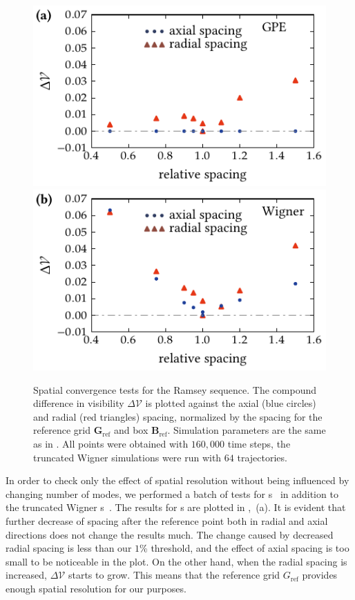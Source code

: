 \begin{figure}
    \centerline{%
    \includegraphics{figures_generated/test/grid_check_gpe.pdf}%
    \includegraphics{figures_generated/test/grid_check_wigner.pdf}}

    \caption[Spatial convergence tests]{
    Spatial convergence tests for the Ramsey sequence.
    The compound difference in visibility $\Delta \mathcal{V}$ is plotted against the axial (blue circles) and radial (red triangles) spacing, normalized by the spacing for the reference grid $\mathbf{G}_{\mathrm{ref}}$ and box $\mathbf{B}_{\mathrm{ref}}$.
    Simulation parameters are the same as in .
    All points were obtained with $160,000$ time steps, the truncated Wigner simulations were run with $64$ trajectories.
    }%

    \label{fig:bec-noise:grid:spatial-convergence}
\end{figure}

In order to check only the effect of spatial resolution without being influenced by changing number of modes, we performed a batch of tests for s~ in addition to the truncated Wigner s~.
The results for s are plotted in ,~(a).
It is evident that further decrease of spacing after the reference point both in radial and axial directions does not change the results much.
The change caused by decreased radial spacing is less than our $1$\% threshold, and the effect of axial spacing is too small to be noticeable in the plot.
On the other hand, when the radial spacing is increased, $\Delta \mathcal{V}$ starts to grow.
This means that the reference grid $G_{\mathrm{ref}}$ provides enough spatial resolution for our purposes.

